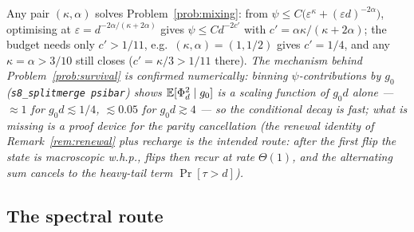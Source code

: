 Any pair $(\kappa,\alpha)$ solves Problem~\ref{prob:mixing}: from
$\psi\le C\bigl(\varepsilon^\kappa+(\varepsilon d)^{-2\alpha}\bigr)$,
optimising at $\varepsilon=d^{-2\alpha/(\kappa+2\alpha)}$ gives
$\psi\le Cd^{-2c'}$ with $c'=\alpha\kappa/(\kappa+2\alpha)$; the
budget needs only $c'>1/11$, e.g.\ $(\kappa,\alpha)=(1,1/2)$ gives
$c'=1/4$, and any $\kappa=\alpha>3/10$ still closes
($c'=\kappa/3>1/11$ there).  \emph{The mechanism behind
Problem~\ref{prob:survival} is confirmed numerically: binning
$\psi$-contributions by $g_0$ (\texttt{s8\_splitmerge psibar}) shows
$\mathbb{E}[\Phi_d^2\mid g_0]$ is a scaling function of $g_0d$ alone ---
$\approx1$ for $g_0d\lesssim1/4$, $\lesssim0.05$ for $g_0d\gtrsim4$
--- so the conditional decay is fast; what is missing is a proof
device for the parity cancellation (the renewal identity of
Remark~\ref{rem:renewal} plus recharge is the intended route: after
the first flip the state is macroscopic w.h.p., flips then recur at
rate $\Theta(1)$, and the alternating sum cancels to the heavy-tail
term $\Pr[\tau>d]$).}

\subsection{The spectral route}\label{sec:spectral}

